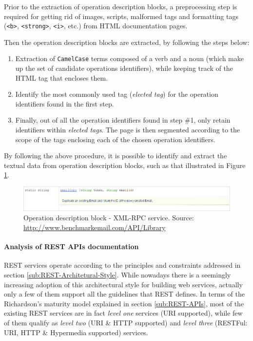 Prior to the extraction of operation description blocks, a preprocessing step is required for getting rid of images, scripts, malformed tags and formatting tags (\texttt{<b>}, \texttt{<strong>}, \texttt{<i>}, etc.) from HTML documentation pages.

Then the operation description blocks are extracted, by following the steps below: 

\begin{enumerate}
 \item Extraction of \texttt{CamelCase} terms composed of a verb and a noun (which make up the set of candidate operations identifiers), while keeping track of the HTML tag that encloses them.
 \item Identify the most commonly used tag (\emph{elected tag}) for the operation identifiers found in the first step.
 \item Finally, out of all the operation identifiers found in step \#1, only retain identifiers within \emph{elected tags}. The page is then segmented according to the scope of the tags enclosing each of the chosen operation identifiers.
\end{enumerate}

By following the above procedure, it is possible to identify and extract the textual data from operation description blocks, such as that illustrated in Figure \ref{xml-rpc-op-block}.

\begin{figure}
 \includegraphics[scale=0.55]{images/xml-rpc-operation-block}

 \caption{Operation description block - XML-RPC service. {\scriptsize Source:
 \protect\href{http://www.benchmarkemail.com/API/Library}{http://www.benchmarkemail.com/API/Library}}}
 \label{xml-rpc-op-block}
\end{figure}

\paragraph{Analysis of REST APIs documentation}
\label{parag:rest}
REST services operate according to the principles and constraints addressed in section \ref{sub:REST-Architetural-Style}. While nowadays there is a seemingly increasing adoption of this architectural style for building web services, actually only a few of them support all the guidelines that REST defines. In terms of the Richardson's maturity model explained in section \ref{sub:REST-APIs}, most of the existing REST services are in fact \emph{level one }services\emph{ }(URI supported), while few of them qualify as \emph{level two }(URI \& HTTP supported) and \emph{level three} (RESTFul: URI, HTTP \& Hypermedia supported) services.

